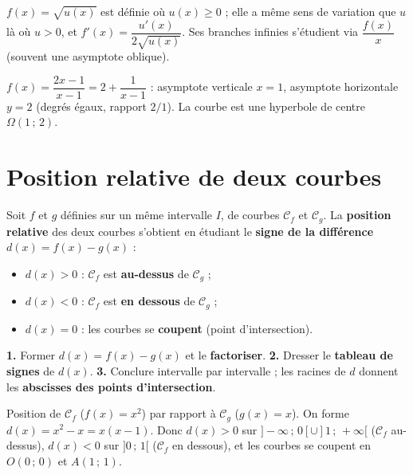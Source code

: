 \begin{propriete}
$f(x)=\sqrt{u(x)}$ est définie où $u(x)\ge 0$ ; elle a même sens de variation que $u$ là
où $u>0$, et $f'(x)=\dfrac{u'(x)}{2\sqrt{u(x)}}$. Ses branches infinies s'étudient via
$\dfrac{f(x)}{x}$ (souvent une asymptote oblique).
\end{propriete}

\begin{exemple}
$f(x)=\dfrac{2x-1}{x-1}=2+\dfrac{1}{x-1}$ : asymptote verticale $x=1$, asymptote
horizontale $y=2$ (degrés égaux, rapport $2/1$). La courbe est une hyperbole de centre
$\Omega(1\,;\,2)$.
\end{exemple}

\section{Position relative de deux courbes}

\begin{definition}
Soit $f$ et $g$ définies sur un même intervalle $I$, de courbes $\mathcal{C}_f$ et
$\mathcal{C}_g$. La \textbf{position relative} des deux courbes s'obtient en étudiant le
\textbf{signe de la différence} $d(x)=f(x)-g(x)$ :
\begin{itemize}
  \item $d(x)>0$ : $\mathcal{C}_f$ est \textbf{au-dessus} de $\mathcal{C}_g$ ;
  \item $d(x)<0$ : $\mathcal{C}_f$ est \textbf{en dessous} de $\mathcal{C}_g$ ;
  \item $d(x)=0$ : les courbes se \textbf{coupent} (point d'intersection).
\end{itemize}
\end{definition}

\begin{aretenir}[Méthode]
\textbf{1.} Former $d(x)=f(x)-g(x)$ et le \textbf{factoriser}. \textbf{2.} Dresser le
\textbf{tableau de signes} de $d(x)$. \textbf{3.} Conclure intervalle par intervalle ; les
racines de $d$ donnent les \textbf{abscisses des points d'intersection}.
\end{aretenir}

\begin{exemple}
Position de $\mathcal{C}_f$ ($f(x)=x^2$) par rapport à $\mathcal{C}_g$ ($g(x)=x$).
On forme $d(x)=x^2-x=x(x-1)$. Donc $d(x)>0$ sur $]-\infty\,;\,0[\cup]1\,;\,+\infty[$
($\mathcal{C}_f$ au-dessus), $d(x)<0$ sur $]0\,;\,1[$ ($\mathcal{C}_f$ en dessous), et les
courbes se coupent en $O(0\,;\,0)$ et $A(1\,;\,1)$.
\end{exemple}

